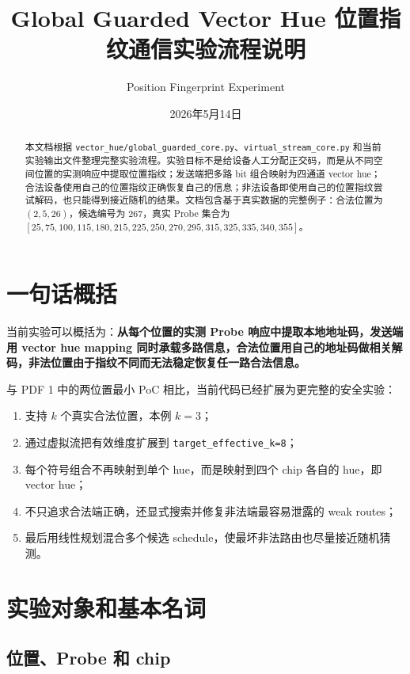 \documentclass[UTF8,a4paper,11pt]{ctexart}
\title{Global Guarded Vector Hue 位置指纹通信实验流程说明}
\author{Position Fingerprint Experiment}
\date{2026年5月14日}
\begin{document}
\maketitle

\begin{abstract}
本文档根据 \texttt{vector\_hue/global\_guarded\_core.py}、\texttt{virtual\_stream\_core.py} 和当前实验输出文件整理完整实验流程。实验目标不是给设备人工分配正交码，而是从不同空间位置的实测响应中提取位置指纹；发送端把多路 bit 组合映射为四通道 vector hue；合法设备使用自己的位置指纹正确恢复自己的信息；非法设备即使用自己的位置指纹尝试解码，也只能得到接近随机的结果。文档包含基于真实数据的完整例子：合法位置为 $(2,5,26)$，候选编号为 267，真实 Probe 集合为 $[25,75,100,115,180,215,225,250,270,295,315,325,335,340,355]$。
\end{abstract}

\section{一句话概括}

当前实验可以概括为：\textbf{从每个位置的实测 Probe 响应中提取本地地址码，发送端用 vector hue mapping 同时承载多路信息，合法位置用自己的地址码做相关解码，非法位置由于指纹不同而无法稳定恢复任一路合法信息。}

与 PDF 1 中的两位置最小 PoC 相比，当前代码已经扩展为更完整的安全实验：
\begin{enumerate}[label=(\arabic*)]
  \item 支持 $k$ 个真实合法位置，本例 $k=3$；
  \item 通过虚拟流把有效维度扩展到 \texttt{target\_effective\_k=8}；
  \item 每个符号组合不再映射到单个 hue，而是映射到四个 chip 各自的 hue，即 vector hue；
  \item 不只追求合法端正确，还显式搜索并修复非法端最容易泄露的 weak routes；
  \item 最后用线性规划混合多个候选 schedule，使最坏非法路由也尽量接近随机猜测。
\end{enumerate}

\section{实验对象和基本名词}

\subsection{位置、Probe 和 chip}
\end{document}
